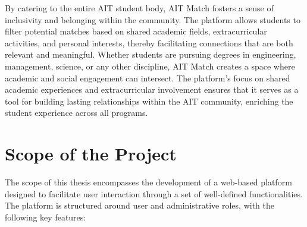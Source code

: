 By catering to the entire AIT student body, AIT Match fosters a sense of inclusivity and belonging within the community. The platform allows students to filter potential matches based on shared academic fields, extracurricular activities, and personal interests, thereby facilitating connections that are both relevant and meaningful. Whether students are pursuing degrees in engineering, management, science, or any other discipline, AIT Match creates a space where academic and social engagement can intersect. The platform’s focus on shared academic experiences and extracurricular involvement ensures that it serves as a tool for building lasting relationships within the AIT community, enriching the student experience across all programs.


\newpage
\section{Scope of the Project}
The scope of this thesis encompasses the development of a web-based platform designed to facilitate user interaction through a set of well-defined functionalities. The platform is structured around user and administrative roles, with the following key features:

